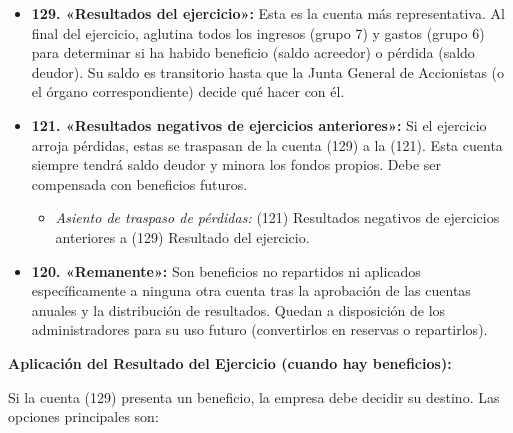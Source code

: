 \documentclass[
  paper=a4,
  ,captions=tableheading
]{scrbook}
\providecommand{\tightlist}{%
  \setlength{\itemsep}{0pt}\setlength{\parskip}{0pt}}
\begin{document}
\begin{itemize}
\tightlist
\item
  \textbf{129. «Resultados del ejercicio»:} Esta es la cuenta más
  representativa. Al final del ejercicio, aglutina todos los ingresos
  (grupo 7) y gastos (grupo 6) para determinar si ha habido beneficio
  (saldo acreedor) o pérdida (saldo deudor). Su saldo es transitorio
  hasta que la Junta General de Accionistas (o el órgano
  correspondiente) decide qué hacer con él.
\item
  \textbf{121. «Resultados negativos de ejercicios anteriores»:} Si el
  ejercicio arroja pérdidas, estas se traspasan de la cuenta (129) a la
  (121). Esta cuenta siempre tendrá saldo deudor y minora los fondos
  propios. Debe ser compensada con beneficios futuros.

  \begin{itemize}
  \tightlist
  \item
    \emph{Asiento de traspaso de pérdidas:} (121) Resultados negativos
    de ejercicios anteriores a (129) Resultado del ejercicio.
  \end{itemize}
\item
  \textbf{120. «Remanente»:} Son beneficios no repartidos ni aplicados
  específicamente a ninguna otra cuenta tras la aprobación de las
  cuentas anuales y la distribución de resultados. Quedan a disposición
  de los administradores para su uso futuro (convertirlos en reservas o
  repartirlos).
\end{itemize}

\textbf{Aplicación del Resultado del Ejercicio (cuando hay beneficios):}

Si la cuenta (129) presenta un beneficio, la empresa debe decidir su
destino. Las opciones principales son:
\end{document}
